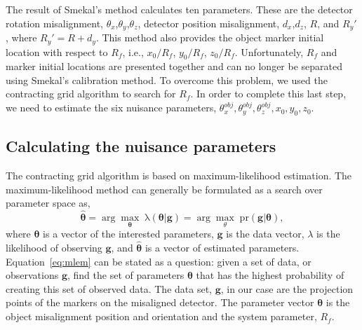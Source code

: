 The result of Smekal's method calculates ten parameters.  These are the detector rotation misalignment, $\theta_x$,$\theta_y$,$\theta_z$, detector position misalignment, $d_x$,$d_z$, $R$, and $R_y'$, where $R_y' = R + d_y$.  This method also provides the object marker initial location with respect to $R_f$, i.e., $x_0/R_f$, $y_0/R_f$, $z_0/R_f$.  Unfortunately, $R_f$ and marker initial locations are presented together and can no longer be separated using Smekal's calibration method.  To overcome this problem, we used the contracting grid algorithm to search for $R_f$.  In order to complete this last step, we need to estimate the six nuisance parameters, $\theta_x^{obj}, \theta_y^{obj}, \theta_z^{obj}, x_0, y_0, z_0$.


\subsection{Calculating the nuisance parameters}
The contracting grid algorithm is based on maximum-likelihood estimation.  The maximum-likelihood method can generally be formulated as a search over parameter space as,
%
\begin{equation}
\label{eq:mlem}
\mathrm{\boldsymbol{\hat{\theta}}} = \arg\max_{\mathbf{\theta}} \; \mathrm{\lambda (\boldsymbol{\theta} | \mathbf{g})} = \arg\max_{\theta} \; \mathrm{pr( \mathbf{g}|\boldsymbol{\theta})},
\end{equation}
%
where $\boldsymbol{\theta}$ is a vector of the interested parameters, $\mathbf{g}$ is the data vector, $\lambda$ is the likelihood of observing $\mathbf{g}$, and $\boldsymbol{\hat{\theta}}$ is a vector of estimated parameters.  Equation~\ref{eq:mlem} can be stated as a question: given a set of data, or observations $\mathbf{g}$, find the set of parameters $\boldsymbol{\theta}$ that has the highest probability of creating this set of observed data.  The data set, $\mathbf{g}$, in our case are the projection points of the markers on the misaligned detector. The parameter vector $\boldsymbol{\theta}$ is the object misalignment position and orientation and the system parameter, $R_f$.  

